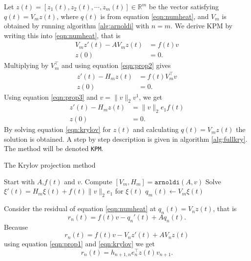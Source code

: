 Let $z(t) = [z_1(t), z_2(t), \cdots, z_m(t)] \in \mathbb{R}^m $ be the vector satisfying $q(t) = V_m z(t)$, where $q(t)$ is from equation \eqref{eqn:numheat}, and $V_m$ is obtained by running algorithm \ref{alg:arnoldi} with $n = m$. 
We derive KPM by writing this into \eqref{eqn:numheat}, that is
\begin{equation*}  \begin{aligned} \label{eqn:KPMtemp1}
V_m z'(t) - A V_m z(t) &= f(t) v \\
z(0)& = 0.
\end{aligned} \end{equation*}
Multiplying by $V_m^{\top}$ and using equation \eqref{eqn:prop2} gives
\begin{equation*} 
\begin{aligned} \label{eqn:KPMtemp2}
z'(t)-H_m z(t) &= f(t) V_m^{\top}  v  \\
z(0)& = 0.
\end{aligned}
\end{equation*}
Using equation \eqref{eqn:prop3} and $v = \|v \|_2 v^1 $, we get
\begin{equation} 
\begin{aligned} \label{eqn:krylov}
z'(t) -H_m z(t) &=  \|v \|_2 e_1 f(t)\\
z(0)& = 0.
\end{aligned}
\end{equation}
By solving equation \eqref{eqn:krylov} for $z(t)$ and calculating $ q(t) = V_m z(t) $ the solution is obtained. A step by step description is given in algorithm \ref{alg:fullkry}. 
The method will be denoted \texttt{KPM}.\\
\begin{algorithm}
\begin{algorithmic} \caption{The Krylov projection method} \label{alg:fullkry} 
\STATE Start with $A$,$f(t)$ and $v$.
\STATE Compute $[V_m ,H_m] = \texttt{arnoldi}(A,v)$
\STATE Solve $  \xi'(t) = H_m \xi(t) + f(t) \| v \|_2 e_1  $ for $\xi(t)$
\STATE $ q_m (t) \leftarrow  V_m \xi(t) $
\end{algorithmic} 
\end{algorithm}

Consider the residual of equation \eqref{eqn:numheat} at $q_n(t) = V_n z (t)$, that is
\begin{equation*}
r_n(t) = f(t) v - q_n'(t) +Aq_n(t).
\end{equation*}
Because
\begin{equation*}
r_n(t) = f(t)v -V_n z'(t) + A V_n z(t)
\end{equation*}
using equation \eqref{eqn:prop1} and \eqref{eqn:krylov} we get
\begin{equation} \label{eqn:rn}
r_n(t) = h_{n+1,n}e_n^\top z(t) v_{n+1}.
\end{equation}

